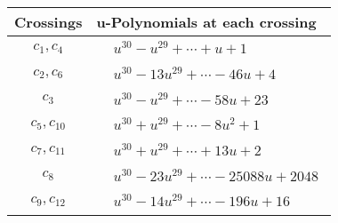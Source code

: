 \documentclass[1p]{elsarticle_modified}
\theoremstyle{definition}
\begin{document}
\begin{tabular}{m{50pt}|m{274pt}}
Crossings & \hspace{64pt}u-Polynomials at each crossing \\
\hline $$\begin{aligned}c_{1},c_{4}\end{aligned}$$&$\begin{aligned}
&u^{30}- u^{29}+\cdots+u+1
\end{aligned}$\\
\hline $$\begin{aligned}c_{2},c_{6}\end{aligned}$$&$\begin{aligned}
&u^{30}-13 u^{29}+\cdots-46 u+4
\end{aligned}$\\
\hline $$\begin{aligned}c_{3}\end{aligned}$$&$\begin{aligned}
&u^{30}- u^{29}+\cdots-58 u+23
\end{aligned}$\\
\hline $$\begin{aligned}c_{5},c_{10}\end{aligned}$$&$\begin{aligned}
&u^{30}+u^{29}+\cdots-8 u^2+1
\end{aligned}$\\
\hline $$\begin{aligned}c_{7},c_{11}\end{aligned}$$&$\begin{aligned}
&u^{30}+u^{29}+\cdots+13 u+2
\end{aligned}$\\
\hline $$\begin{aligned}c_{8}\end{aligned}$$&$\begin{aligned}
&u^{30}-23 u^{29}+\cdots-25088 u+2048
\end{aligned}$\\
\hline $$\begin{aligned}c_{9},c_{12}\end{aligned}$$&$\begin{aligned}
&u^{30}-14 u^{29}+\cdots-196 u+16
\end{aligned}$\\
\hline
\end{tabular}\\~\\
\newpage\renewcommand{\arraystretch}{1}
\end{document}
